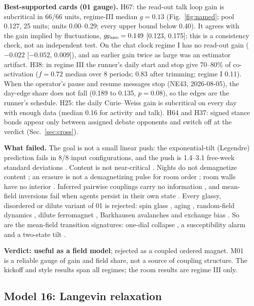 \textbf{Best-supported cards (01 gauge).} H67: the read-out talk loop gain is subcritical in 66/66 units, regime-III median $g=0.13$ (Fig.~\ref{fig:named}; pool 0.127, 25 units; units 0.00--0.29; every upper bound below 0.40). It agrees with the gain implied by fluctuations, $g_{\rm Fano}=0.149$ [0.123, 0.175]; this is a consistency check, not an independent test. On the chat clock regime I has no read-out gain ($-0.022$ [$-0.052$, 0.009]), and an earlier gain twice as large  was an estimator artifact. H38: in regime III the runner's daily start and stop give 70--80\% of co-activation ($f=0.72$ median over 8 periods; 0.83 after trimming; regime I 0.11). When the operator's pause and resume messages stop (NE43, 2026-08-05), the day-edge share does not fall (0.189 to 0.135, $p=0.08$), so the edges are the runner's schedule. H25: the daily Curie--Weiss gain is subcritical on every day with enough data (median 0.16 for activity and talk). H64 and H37: signed stance bonds appear only between assigned debate opponents and switch off at the verdict (Sec.~\ref{sec:cross}).

\textbf{What failed.} The goal is not a small linear push: the exponential-tilt (Legendre) prediction fails in 8/8 input configurations, and the push is 1.4--3.1 free-week standard deviations . Content is not near-critical . Nights do not demagnetize content ; an erasure is not a demagnetizing pulse for room order ; room walls have no interior . Inferred pairwise couplings carry no information , and mean-field inversions fail when agents persist in their own state . Every glassy, disordered or dilute variant of 01 is rejected: spin glass , aging , random-field dynamics , dilute ferromagnet , Barkhausen avalanches  and exchange bias . So are the mean-field transition signatures: one-dial collapse , a susceptibility alarm  and a two-state tilt .

\textbf{Verdict: useful as a field model}; rejected as a coupled ordered magnet. M01 is a reliable gauge of gain and field share, not a source of coupling structure. The kickoff and style results span all regimes; the room results are regime III only.

\subsection{Model 16: Langevin relaxation}\label{sec:m16}

